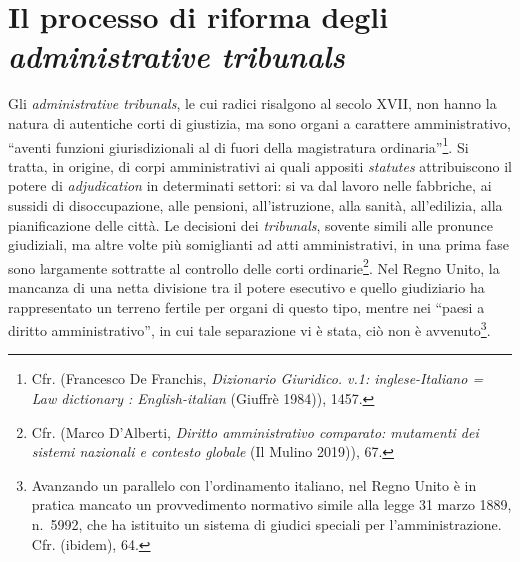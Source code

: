 \documentclass[12pt,it,a4paper,]{report}
\begin{document}
\hypertarget{il-processo-di-riforma-degli-administrative-tribunals}{%
\section{\texorpdfstring{Il processo di riforma degli
\emph{administrative
tribunals}}{Il processo di riforma degli administrative tribunals}}\label{il-processo-di-riforma-degli-administrative-tribunals}}

Gli \emph{administrative tribunals}, le cui radici risalgono al secolo
XVII, non hanno la natura di autentiche corti di giustizia, ma sono
organi a carattere amministrativo, ``aventi funzioni giurisdizionali al
di fuori della magistratura ordinaria''\footnote{Cfr. (Francesco De
  Franchis, \emph{Dizionario Giuridico. v.1: inglese-Italiano = Law
  dictionary : English-italian} (Giuffrè 1984)), 1457.}. Si tratta, in
origine, di corpi amministrativi ai quali appositi \emph{statutes}
attribuiscono il potere di \emph{adjudication} in determinati settori:
si va dal lavoro nelle fabbriche, ai sussidi di disoccupazione, alle
pensioni, all'istruzione, alla sanità, all'edilizia, alla pianificazione
delle città. Le decisioni dei \emph{tribunals}, sovente simili alle
pronunce giudiziali, ma altre volte più somiglianti ad atti
amministrativi, in una prima fase sono largamente sottratte al controllo
delle corti ordinarie\footnote{Cfr. (Marco D'Alberti, \emph{Diritto
  amministrativo comparato: mutamenti dei sistemi nazionali e contesto
  globale} (Il Mulino 2019)), 67.}. Nel Regno Unito, la mancanza di una
netta divisione tra il potere esecutivo e quello giudiziario ha
rappresentato un terreno fertile per organi di questo tipo, mentre nei
``paesi a diritto amministrativo'', in cui tale separazione vi è stata,
ciò non è avvenuto\footnote{Avanzando un parallelo con l'ordinamento
  italiano, nel Regno Unito è in pratica mancato un provvedimento
  normativo simile alla legge 31 marzo 1889, n.~5992, che ha istituito
  un sistema di giudici speciali per l'amministrazione. Cfr. (ibidem),
  64.}.
\end{document}
